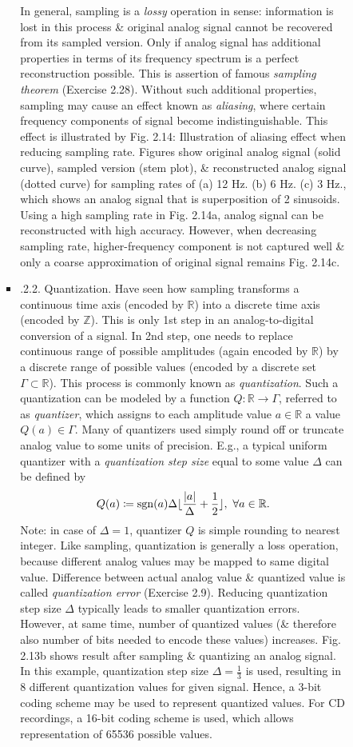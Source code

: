 \documentclass{article}
\begin{document}
\begin{itemize}
\begin{itemize}
\begin{itemize}
\begin{itemize}
				In general, sampling is a {\it lossy} operation in sense: information is lost in this process \& original analog signal cannot be recovered from its sampled version. Only if analog signal has additional properties in terms of its frequency spectrum is a perfect reconstruction possible. This is assertion of famous {\it sampling theorem} (Exercise 2.28). Without such additional properties, sampling may cause an effect known as {\it aliasing}, where certain frequency components of signal become indistinguishable. This effect is illustrated by {\sf Fig. 2.14: Illustration of aliasing effect when reducing sampling rate. Figures show original analog signal (solid curve), sampled version (stem plot), \& reconstructed analog signal (dotted curve) for sampling rates of (a) 12 Hz. (b) 6 Hz. (c) 3 Hz.}, which shows an analog signal that is superposition of 2 sinusoids. Using a high sampling rate in {\sf Fig. 2.14a}, analog signal can be reconstructed with high accuracy. However, when decreasing sampling rate, higher-frequency component is not captured well \& only a coarse approximation of original signal remains {\sf Fig. 2.14c}.
				\item {.2.2. Quantization.} Have seen how sampling transforms a continuous time axis (encoded by $\mathbb{R}$) into a discrete time axis (encoded by $\mathbb{Z}$). This is only 1st step in an analog-to-digital conversion of a signal. In 2nd step, one needs to replace continuous range of possible amplitudes (again encoded by $\mathbb{R}$) by a discrete range of possible values (encoded by a discrete set $\Gamma\subset\mathbb{R}$). This process is commonly known as {\it quantization}. Such a quantization can be modeled by a function $Q:\mathbb{R}\to\Gamma$, referred to as {\it quantizer}, which assigns to each amplitude value $a\in\mathbb{R}$ a value $Q(a)\in\Gamma$. Many of quantizers used simply round off or truncate analog value to some units of precision. E.g., a typical uniform quantizer with a {\it quantization step size} equal to some value $\Delta$ can be defined by
				\begin{equation*}
					Q(a)\coloneqq{\rm sgn}(a)\Delta\lfloor\frac{|a|}{\Delta} + \frac{1}{2}\rfloor,\ \forall a\in\mathbb{R}.
				\end{equation*}
				Note: in case of $\Delta = 1$, quantizer $Q$ is simple rounding to nearest integer. Like sampling, quantization is generally a loss operation, because different analog values may be mapped to same digital value. Difference between actual analog value \& quantized value is called {\it quantization error} (Exercise 2.9). Reducing quantization step size $\Delta$ typically leads to smaller quantization errors. However, at same time, number of quantized values (\& therefore also number of bits needed to encode these values) increases. {\sf Fig. 2.13b} shows result after sampling \& quantizing an analog signal. In this example, quantization step size $\Delta = \frac{1}{3}$ is used, resulting in 8 different quantization values for given signal. Hence, a 3-bit coding scheme may be used to represent quantized values. For CD recordings, a 16-bit coding scheme is used, which allows representation of 65536 possible values.

\end{itemize}
\end{itemize}
\end{itemize}
\end{itemize}
\end{document}
